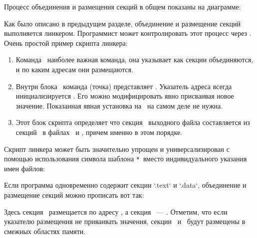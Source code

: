\bigskip
Процесс объединения и размещения секций в общем показаны на диаграмме:


\secup
\secup
{}\secdown

Как было описано в предыдущем разделе, объединение и размещение секций
выполняется линкером. Программист может контролировать этот процесс через
. Очень простой пример скрипта линкера:


\begin{enumerate}

\item Команда \ наиболее важная команда, она указывает как
секции объединяются, и по каким адресам они размещаются.

\item Внутри блока \ команда  (точка) представляет
. Указатель
адреса всегда инициализируется . Его можно модифицировать явно
присваивая новое значение. Показанная явная установка на \ на самом
деле не нужна.

\item Этот блок скрипта определяет что секция \ выходного файла
составляется из секций \ в файлах \ и ,
причем именно в этом порядке.

\end{enumerate}

Скрипт линкера может быть значительно упрощен и универсализирован с помощью
использования символа шаблона \verb|*|\ вместо индивидуального указания имен
файлов:


Если программа одновременно содержит секции `.text` и `.data`, объединение и 
размещение секций можно прописать вот так: 


Здесь секция \ размещается по адресу , а секция
\ --- . Отметим, что если указателю размещения не
приваивать значения, секции \ и \ будут размещены в
смежных областях памяти.


